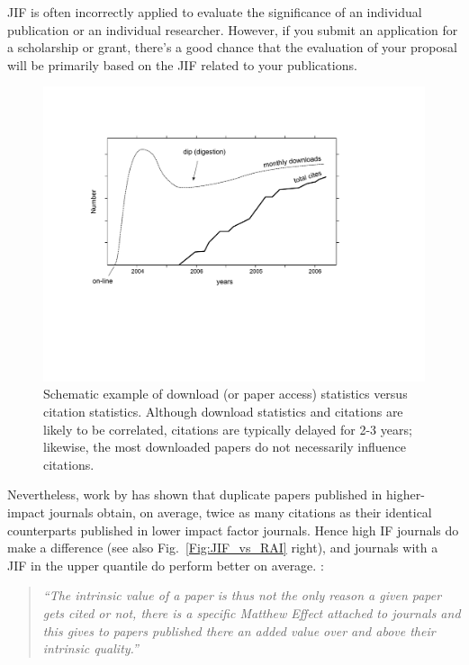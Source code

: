 \documentclass[graybox,envcountchap,sectrefs,UStrade]{svmono}
\begin{document}
\begin{svgraybox}
JIF is often incorrectly applied to evaluate the significance of an individual publication or an individual researcher. However, if you submit an application for a scholarship or grant, there's a good chance that the evaluation of your proposal will be primarily based on the JIF related to your publications.
\end{svgraybox}\label{R:impactfactorgame}

\begin{figure}[!htb]
\begin{center}
  \includegraphics[width=.8\textwidth]{Fig_cites_vs_downloads.pdf}
\caption{Schematic example of download (or paper access) statistics versus citation statistics. Although download statistics and citations are likely to be correlated, citations are typically delayed for 2-3 years; likewise, the most downloaded papers do not necessarily influence citations.} \label{Fig:cites_vs_downloads}
\end{center}
\end{figure}

Nevertheless, work by \citet{LariviereGingras2010} has shown that duplicate papers published in higher-impact journals obtain, on average, twice as many citations as their identical counterparts published in lower impact factor journals. Hence high IF journals do make a difference (see also Fig.\@~\ref{Fig:JIF_vs_RAI} right), and journals with a JIF in the upper quantile do perform better on average. \citet{LariviereGingras2010}:

\begin{quote}
\emph{``The intrinsic value of a paper is thus not the only reason a given paper gets cited or not, there is a specific Matthew Effect attached to journals and this gives to papers published there an added value over and above their intrinsic quality.''}
\end{quote}
\end{document}
